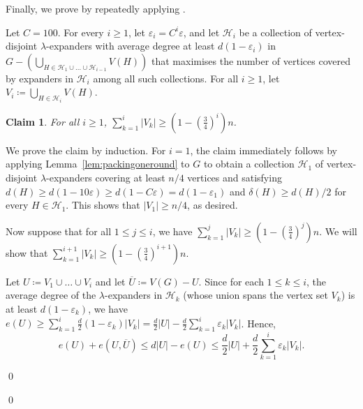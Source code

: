 \documentclass[10pt]{article}
\theoremstyle{plain}
\numberwithin{theorem}{section}
\newtheorem{lemma}[theorem]{Lemma}
\newtheorem{claim}{Claim}[theorem]
\theoremstyle{definition}
\theoremstyle{remark}
\renewenvironment{proof}[1][]{\begin{trivlist}
\item[\hspace{\labelsep}{\bf\noindent Proof#1.\/}] }{\qed\end{trivlist}}
\newcommand{\cH}{\mathcal{H}}
\renewcommand{\setminus}{-}
\newcommand{\eps}{\varepsilon}
\theoremstyle{plain}
\begin{document}

Finally, we prove  by repeatedly applying .


\begin{proof}[ of \Cref{lem:expandercoverweak}]
	Let $C = 100$. For every $i \ge 1$, let $\eps_i = C^{i} \eps$, and let $\cH_i$ be a collection of vertex-disjoint $\lambda$-expanders with average degree at least $d(1- \eps_i)$ in $G \setminus (\bigcup_{H \in \cH_1 \cup \ldots \cup \cH_{i-1}} V(H))$ that maximises the number of vertices covered by expanders in $\cH_i$ among all such collections. For all $i \ge 1$, let $V_i \coloneqq \bigcup_{H \in \cH_i} V(H)$. 

	\begin{claim}
		\label{claim:coverbyexpanders}
		For all $i \ge 1$, $\sum_{k = 1}^i |V_k| \ge (1 - (\frac{3}{4})^{i})n$.
	\end{claim}
	\begin{proof}[ of claim] 
		We prove the claim by induction. For $i = 1$, the claim immediately follows by applying Lemma~\ref{lem:packingoneround}
		to $G$ to obtain a collection $\cH_1$ of vertex-disjoint $\lambda$-expanders covering at least $n/4$ vertices and satisfying $d(H) \ge d(1 - 10 \eps) \ge d(1 - C \eps) = d (1 - \eps_1)$ and $\delta(H) \ge d(H)/2$ for every $H \in \cH_1$. This shows that $|V_1| \ge n/4$, as desired.

		Now suppose that for all $1 \le j \le i$, we have $\sum_{k = 1}^j |V_k| \ge (1 - (\frac{3}{4})^j)n$. We will show that $\sum_{k = 1}^{i+1} |V_k| \ge (1 - (\frac{3}{4})^{i+1})n$. 

		Let $U \coloneqq V_1 \cup \ldots \cup V_i$ and let $\overline{U} \coloneqq V(G) \setminus U$. Since for each $1 \le k \le i$, the average degree of the $\lambda$-expanders in $\cH_k$ (whose union spans the vertex set $V_k$) is at least $d(1- \eps_k)$, we have $e(U) \ge \sum_{k=1}^i \frac{d}{2} (1- \eps_k) |V_k| = \frac{d}{2} |U| - \frac{d}{2} \sum_{k=1}^i \eps_k|V_k|$. Hence, 
		\begin{equation}
			\label{eq:claim2:1}
			e(U) + e(U, \overline{U}) \le d |U| - e(U) \le \frac{d}{2} |U| + \frac{d}{2} \sum_{k=1}^i \eps_k|V_k|.
		\end{equation}


\end{proof}
\end{proof}
\end{document}
